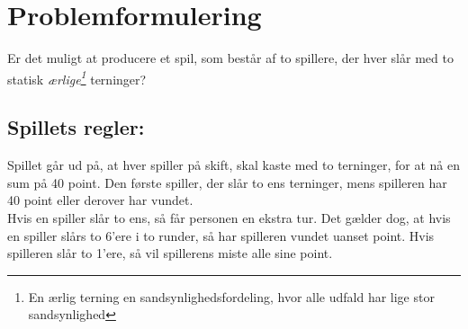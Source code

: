\chapter{Problemformulering}
Er det muligt at producere et spil, som består af to spillere, 
der hver slår med to statisk \textit{ærlige\footnote{En ærlig terning en sandsynlighedsfordeling, hvor alle udfald har lige stor sandsynlighed}} terninger?

\section*{Spillets regler:}

Spillet går ud på, at hver spiller på skift, skal kaste med to terninger, for at nå en sum på 40 point.
Den første spiller, der slår to ens terninger, mens spilleren har 40 point eller derover har vundet.
\\ Hvis en spiller slår to ens, så får personen en ekstra tur.
Det gælder dog, at hvis en spiller slårs to 6'ere i to runder, så har spilleren vundet uanset point.
Hvis spilleren slår to 1'ere, så vil spillerens miste alle sine point.
